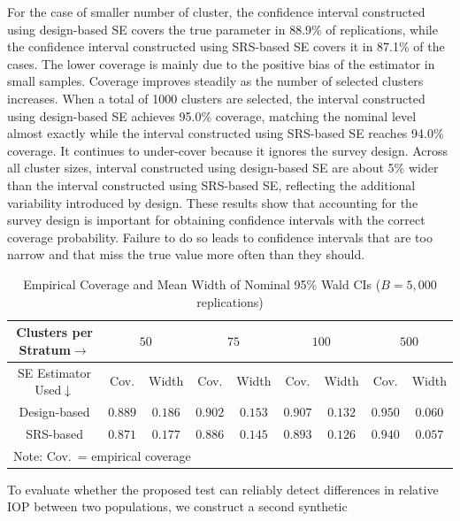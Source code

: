 \documentclass[12pt]{article}
\theoremstyle{plain}
\theoremstyle{definition}
\begin{document}
For the case of smaller number of cluster, the confidence interval constructed using design-based SE covers the true parameter in 88.9\% of replications, while the confidence interval constructed using SRS-based SE covers it in 87.1\% of the cases. The lower coverage is mainly due to the positive bias of the estimator in small samples. Coverage improves steadily as the number of selected clusters increases. When a total of 1000 clusters are selected, the interval constructed using design-based SE achieves 95.0\% coverage, matching the nominal level almost exactly while the interval constructed using SRS-based SE reaches 94.0\% coverage. It continues to under-cover because it ignores the survey design. Across all cluster sizes, interval constructed using design-based SE are about 5\% wider than the interval constructed using SRS-based SE, reflecting the additional variability introduced by design. These results show that accounting for the survey design is important for obtaining confidence intervals with the correct coverage probability. Failure to do so leads to confidence intervals that are too narrow and that miss the true value more often than they should.
\begin{table}[ht]
\centering
\caption{Empirical Coverage and Mean Width of Nominal 95\% Wald CIs
         ($B = 5{,}000$ replications)}
\label{tab:sim_coverage}
\setlength{\tabcolsep}{6pt}
\begin{tabular}{c|cc|cc|cc|cc}
\hline
Clusters per Stratum$\rightarrow$ & \multicolumn{2}{c}{$50$}
 & \multicolumn{2}{c}{$75$}
 & \multicolumn{2}{c}{$100$}
 & \multicolumn{2}{c}{$500$} \\
 \hline
SE Estimator Used$\downarrow$
 & Cov. & Width
 & Cov. & Width
 & Cov. & Width
 & Cov. & Width \\
\hline
Design-based 
 & $0.889$ & $0.186$
 & $0.902$ & $0.153$
 & $0.907$ & $0.132$
 & $0.950$ & $0.060$ \\
SRS-based
 & $0.871$ & $0.177$
 & $0.886$ & $0.145$
 & $0.893$ & $0.126$
 & $0.940$ & $0.057$ \\
\hline
\multicolumn{9}{l}{\footnotesize Note: Cov.\ = empirical coverage}
\end{tabular}
\end{table}
To evaluate whether the proposed test can reliably detect differences in
relative IOP between two populations, we construct a second synthetic
\end{document}
